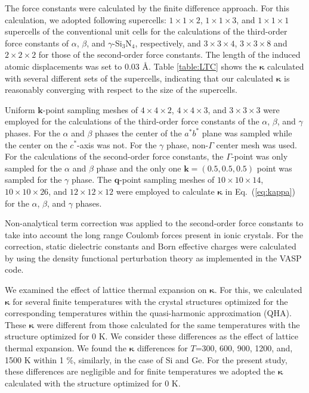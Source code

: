 \documentclass[twocolumn,amsmath,amssymb,a4paper,prb,superscriptaddress,floatfix]{revtex4-1}
\begin{document}
The force constants were calculated by the finite difference
approach\cite{wei-supercell}. For this calculation, we adopted following
supercells: $1\times 1\times2$, $1\times 1\times3$, and $1\times 1\times1$
supercells of the conventional unit cells for the calculations of the
third-order force constants of $\alpha$, $\beta$, and $\gamma$-Si$_3$N$_4$,
respectively, and $3\times 3\times4$, $3\times 3\times8$ and $2\times
2\times2$ for those of the second-order force constants.  The length of the
induced atomic displacements was set to 0.03 \AA.  Table \ref{table:LTC} shows
the $\boldsymbol{\kappa}$ calculated with several different sets of the
supercells, indicating that our calculated $\boldsymbol{\kappa}$ is reasonably
converging with respect to the size of the supercells. 

Uniform $\mathbf{k}$-point sampling meshes of $4\times 4\times 2$, $4\times
4\times 3$, and $3\times 3\times 3$ were employed for the calculations of the
third-order force constants of the $\alpha$, $\beta$, and $\gamma$ phases. For
the $\alpha$ and $\beta$ phases the center of the $a^*b^*$ plane was sampled
while the center on the $c^*$-axis was not. For the $\gamma$ phase, non-$\Gamma$
center mesh was used. For the calculations  of the second-order force constants,
the $\Gamma$-point was only sampled for the $\alpha$ and $\beta$ phase and the
only one $\mathbf{k}=(0.5, 0.5, 0.5)$ point was sampled for the $\gamma$ phase.
The $\mathbf{q}$-point sampling meshes of $10\times 10\times 14$, $10\times
10\times 26$, and $12\times 12\times 12$ were employed to calculate
$\boldsymbol{\kappa}$ in Eq.~(\ref{eq:kappa}) for the $\alpha$, $\beta$, and
$\gamma$ phases.

Non-analytical term correction\cite{wang} was applied to the second-order force
constants to take into account the long range Coulomb forces present in ionic
crystals. For the correction, static dielectric constants and Born effective
charges were calculated by using the density functional perturbation theory
as implemented in the VASP code\cite{vasp-lepsiron,lepsiron}.

We examined the effect of lattice thermal expansion on $\boldsymbol{\kappa}$.
For this, we calculated $\boldsymbol{\kappa}$ for several finite
temperatures with the crystal structures optimized for the
corresponding temperatures within the quasi-harmonic approximation
(QHA)\cite{dove-p76}. These $\boldsymbol{\kappa}$ were different from those
calculated for the same temperatures with the structure
optimized for 0 K. We consider these differences as the effect of lattice
thermal expansion.  We found the $\boldsymbol{\kappa}$ differences for $T$=300,
600, 900, 1200, and, 1500 K within 1 \%, similarly, in the case of Si and
Ge\cite{ward-ltc}. For the present study, these differences are negligible and
for finite temperatures we adopted the $\boldsymbol{\kappa}$ calculated with the
structure optimized for 0 K.
\end{document}
